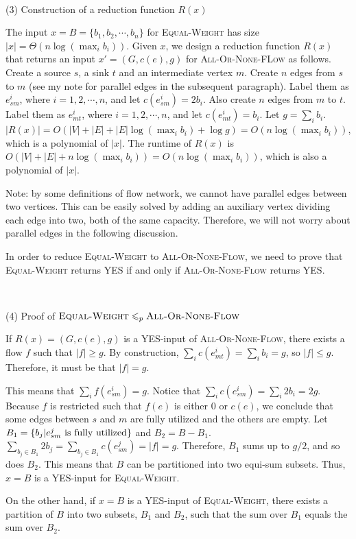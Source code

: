 \documentclass{article}
\begin{document}
~

\noindent(3) Construction of a reduction function $R(x)$

The input $x=B=\{b_1,b_2,\cdots,b_n\}$ for \textsc{Equal-Weight} has size $|x|=\Theta(n\log(\max_ib_i))$. Given $x$, we design a reduction function $R(x)$ that returns an input $x'=(G,c(e),g)$ for \textsc{All-Or-None-FLow} as follows. Create a source $s$, a sink $t$ and an intermediate vertex $m$. Create $n$ edges from $s$ to $m$ (see my note for parallel edges in the subsequent paragraph). Label them as $e_{sm}^i$, where $i=1,2,\cdots,n$, and let $c(e_{sm}^i)=2b_i$. Also create $n$ edges from $m$ to $t$. Label them as $e_{mt}^i$, where $i=1,2,\cdots,n$, and let $c(e_{mt}^i)=b_i$. Let $g=\sum_ib_i$. $|R(x)|=O(|V|+|E|+|E|\log(\max_ib_i)+\log g)=O(n\log(\max_ib_i))$, which is a polynomial of $|x|$. The runtime of $R(x)$ is $O(|V|+|E|+n\log(\max_ib_i))=O(n\log(\max_ib_i))$, which is also a polynomial of $|x|$.

Note: by some definitions of flow network, we cannot have parallel edges between two vertices. This can be easily solved by adding an auxiliary vertex dividing each edge into two, both of the same capacity. Therefore, we will not worry about parallel edges in the following discussion.

In order to reduce \textsc{Equal-Weight} to \textsc{All-Or-None-Flow}, we need to prove that \textsc{Equal-Weight} returns YES if and only if \textsc{All-Or-None-Flow} returns YES.

~

\noindent(4) Proof of $\textsc{Equal-Weight}\leqslant_p\textsc{All-Or-None-Flow}$

If $R(x)=(G,c(e),g)$ is a YES-input of \textsc{All-Or-None-Flow}, there exists a flow $f$ such that $|f|\geqslant g$. By construction, $\sum_ic(e_{mt}^i)=\sum_ib_i=g$, so $|f|\leqslant g$. Therefore, it must be that $|f|=g$.

This means that $\sum_if(e_{sm}^i)=g$. Notice that $\sum_ic(e_{sm}^i)=\sum_i2b_i=2g$. Because $f$ is restricted such that $f(e)$ is either 0 or $c(e)$, we conclude that some edges between $s$ and $m$ are fully utilized and the others are empty. Let $B_1=\{b_j|e_{sm}^j\textup{ is fully utilized}\}$ and $B_2=B-B_1$. $\sum_{b_j\in B_1}2b_j=\sum_{b_j\in B_1}c(e_{sm}^j)=|f|=g$. Therefore, $B_1$ sums up to $g/2$, and so does $B_2$. This means that $B$ can be partitioned into two equi-sum subsets. Thus, $x=B$ is a YES-input for \textsc{Equal-Weight}.

On the other hand, if $x=B$ is a YES-input of \textsc{Equal-Weight}, there exists a partition of $B$ into two subsets, $B_1$ and $B_2$, such that the sum over $B_1$ equals the sum over $B_2$.
\end{document}
